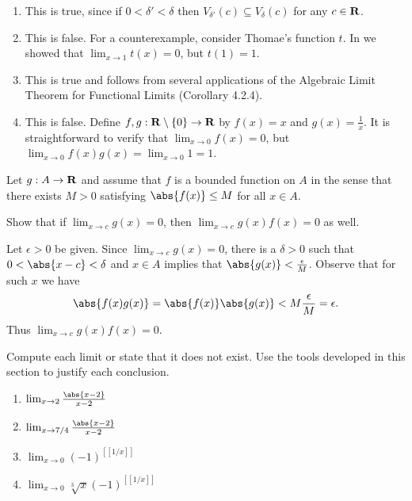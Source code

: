 \documentclass{lew98_solutions}
\begin{document}
\begin{solution}
    \begin{enumerate}
        \item This is true, since if \( 0 < \delta' < \delta \) then \( V_{\delta'}(c) \subseteq V_{\delta}(c) \) for any \( c \in \mathbf{R} \).

        \item This is false. For a counterexample, consider Thomae's function \( t \). In  we showed that \( \lim_{x \to 1} t(x) = 0 \), but \( t(1) = 1 \).

        \item This is true and follows from several applications of the Algebraic Limit Theorem for Functional Limits (Corollary 4.2.4).

        \item This is false. Define \( f, g : \mathbf{R} \setminus \{ 0 \} \to \mathbf{R} \) by \( f(x) = x \) and \( g(x) = \tfrac{1}{x} \). It is straightforward to verify that \( \lim_{x \to 0} f(x) = 0 \), but \( \lim_{x \to 0} f(x) g(x) = \lim_{x \to 0} 1 = 1 \).
    \end{enumerate}
\end{solution}

\begin{exercise}
\label{ex:4.2.7}
    Let \( g : A \to \mathbf{R} \) and assume that \( f \) is a bounded function on \( A \) in the sense that there exists \( M > 0 \) satisfying \( \abs{f(x)} \leq M \) for all \( x \in A \).

    Show that if \( \lim_{x \to c} g(x) = 0 \), then \( \lim_{x \to c} g(x) f(x) = 0 \) as well.
\end{exercise}

\begin{solution}
    Let \( \epsilon > 0 \) be given. Since \( \lim_{x \to c} g(x) = 0 \), there is a \( \delta > 0 \) such that \( 0 < \abs{x - c} < \delta \) and \( x \in A \) implies that \( \abs{g(x)} < \tfrac{\epsilon}{M} \). Observe that for such \( x \) we have
    \[
        \abs{f(x) g(x)} = \abs{f(x)} \abs{g(x)} < M \frac{\epsilon}{M} = \epsilon.
    \]
    Thus \( \lim_{x \to c} g(x) f(x) = 0 \).
\end{solution}

\begin{exercise}
\label{ex:4.2.8}
    Compute each limit or state that it does not exist. Use the tools developed in this section to justify each conclusion.
    \begin{enumerate}
        \item \( \lim_{x \to 2} \tfrac{\abs{x-2}}{x-2} \)

        \item \( \lim_{x \to 7/4} \tfrac{\abs{x-2}}{x-2} \)

        \item \( \lim_{x \to 0} (-1)^{[[1/x]]} \)

        \item \( \lim_{x \to 0} \sqrt[3]{x} (-1)^{[[1/x]]} \)
    \end{enumerate}
\end{exercise}
\end{document}
